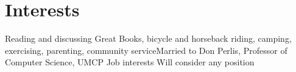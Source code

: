 \documentclass[fullpage,12pt]{article}
\begin{document}
\section{Interests}

	Reading and discussing Great Books, bicycle and
horseback riding, camping, exercising, parenting, community
serviceMarried to Don Perlis, Professor of Computer Science, UMCP
Job interests	Will consider any position








\end{document}

